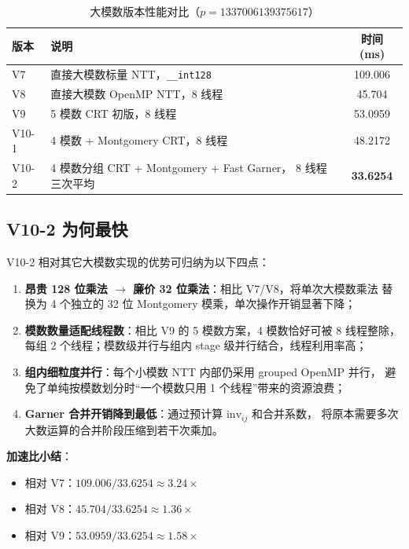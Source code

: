 \documentclass[UTF8,a4paper,10pt]{ctexart}
\begin{document}
\begin{table}[H]
  \centering
  \renewcommand{\arraystretch}{1.15}
  \begin{tabular}{lp{6.5cm}c}
  \toprule  
  \textbf{版本} & \textbf{说明} & \textbf{时间 (ms)}\\
  \midrule
  V7    & 直接大模数标量 NTT，\texttt{\_\_int128}              & 109.006 \\
  V8    & 直接大模数 OpenMP NTT，8 线程                        & 45.704  \\
  V9    & 5 模数 CRT 初版，8 线程                              & 53.0959 \\
  V10-1 & 4 模数 + Montgomery CRT，8 线程                      & 48.2172 \\
  V10-2 & 4 模数分组 CRT + Montgomery + Fast Garner，
          8 线程三次平均                                       & \textbf{33.6254} \\
  \bottomrule
  \end{tabular}
  \caption{大模数版本性能对比（$p = 1337006139375617$）}
  \label{tab:large-modulus}
\end{table}

\subsection{V10-2 为何最快}

V10-2 相对其它大模数实现的优势可归纳为以下四点：

\begin{enumerate}
  \item \textbf{昂贵 128 位乘法 $\to$ 廉价 32 位乘法}：相比 V7/V8，将单次大模数乘法
        替换为 4 个独立的 32 位 Montgomery 模乘，单次操作开销显著下降；
  \item \textbf{模数数量适配线程数}：相比 V9 的 5 模数方案，4 模数恰好可被 8 线程整除，
        每组 2 个线程；模数级并行与组内 stage 级并行结合，线程利用率高；
  \item \textbf{组内细粒度并行}：每个小模数 NTT 内部仍采用 grouped OpenMP 并行，
        避免了单纯按模数划分时``一个模数只用 1 个线程''带来的资源浪费；
  \item \textbf{Garner 合并开销降到最低}：通过预计算 $\mathrm{inv}_{ij}$ 和合并系数，
        将原本需要多次大数运算的合并阶段压缩到若干次乘加。
\end{enumerate}

\textbf{加速比小结}：

\begin{itemize}
  \item 相对 V7：$109.006 / 33.6254 \approx 3.24\times$
  \item 相对 V8：$45.704 / 33.6254 \approx 1.36\times$
  \item 相对 V9：$53.0959 / 33.6254 \approx 1.58\times$
\end{itemize}
\end{document}
